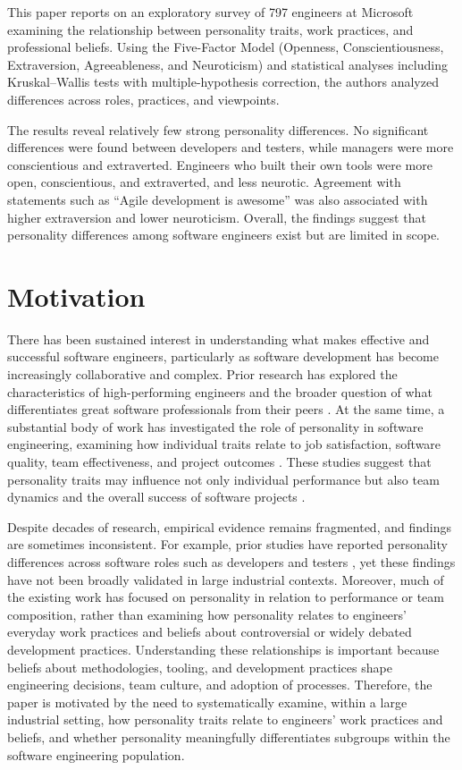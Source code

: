 This paper reports on an exploratory survey of 797 engineers at Microsoft examining the relationship between personality traits, work practices, and professional beliefs. Using the Five-Factor Model (Openness, Conscientiousness, Extraversion, Agreeableness, and Neuroticism) and statistical analyses including Kruskal–Wallis tests with multiple-hypothesis correction, the authors analyzed differences across roles, practices, and viewpoints.

The results reveal relatively few strong personality differences. No significant differences were found between developers and testers, while managers were more conscientious and extraverted. Engineers who built their own tools were more open, conscientious, and extraverted, and less neurotic. Agreement with statements such as “Agile development is awesome” was also associated with higher extraversion and lower neuroticism. Overall, the findings suggest that personality differences among software engineers exist but are limited in scope.

\section{Motivation}
There has been sustained interest in understanding what makes effective and successful software engineers, particularly as software development has become increasingly collaborative and complex. Prior research has explored the characteristics of high-performing engineers and the broader question of what differentiates great software professionals from their peers \cite{Li2015}. At the same time, a substantial body of work has investigated the role of personality in software engineering, examining how individual traits relate to job satisfaction, software quality, team effectiveness, and project outcomes \cite{Cruz2015,Capretz2003}. These studies suggest that personality traits may influence not only individual performance but also team dynamics and the overall success of software projects \cite{CapretzAhmed2010}.

Despite decades of research, empirical evidence remains fragmented, and findings are sometimes inconsistent. For example, prior studies have reported personality differences across software roles such as developers and testers \cite{Kanij2015}, yet these findings have not been broadly validated in large industrial contexts. Moreover, much of the existing work has focused on personality in relation to performance or team composition, rather than examining how personality relates to engineers’ everyday work practices and beliefs about controversial or widely debated development practices. Understanding these relationships is important because beliefs about methodologies, tooling, and development practices shape engineering decisions, team culture, and adoption of processes. Therefore, the paper is motivated by the need to systematically examine, within a large industrial setting, how personality traits relate to engineers’ work practices and beliefs, and whether personality meaningfully differentiates subgroups within the software engineering population.

